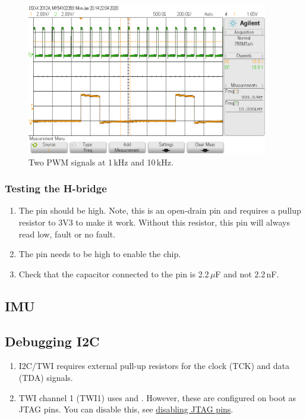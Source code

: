 \begin{figure}
\centering
\includegraphics[height=2.60417in]{figs/PWM_2.png}
\caption{Two PWM signals at 1\,kHz and 10\,kHz.}
\end{figure}


\subsubsection{Testing the H-bridge}
\label{testing-the-h-bridge}

\begin{enumerate}
\item The  pin should be high.  Note, this is an
  open-drain pin and requires a pullup resistor to 3V3 to make it
  work.  Without this resistor, this pin will always read low, fault
  or no fault.

\item The  pin needs to be high to enable the chip.

\item Check that the capacitor connected to the  pin is
  2.2\,$\mu$F and not 2.2\,nF.
\end{enumerate}


\subsection{IMU}
\label{imu}

\subsection{Debugging I2C}
\label{debugging-i2c}

\begin{enumerate}
\item
  I2C/TWI requires external pull-up resistors for the clock (TCK) and
  data (TDA) signals.
\item
  TWI channel 1 (TWI1) uses  and . However, these are configured
  on boot as JTAG pins. You can disable this, see
  \hyperref[disabling-jtag-pins]{disabling JTAG pins}.
\end{enumerate}

